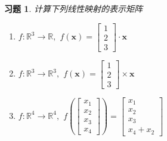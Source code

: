 \documentclass[UTF8]{ctexart}
\newcommand\bs[1]{\boldsymbol{ #1}}
\newtheorem{ex}[thm]{习题}
\begin{document}
\begin{ex}
计算下列线性映射的表示矩阵

\begin{enumerate}
\item $f : \mathbb{R}^3 \to \mathbb{R},$ $f (\bs x ) = \begin{bmatrix}
				1 \\ 2 \\ 3
			\end{bmatrix}\cdot \bs x$

\item $f : \mathbb{R}^3 \to \mathbb{R}^3,$ $f (\bs x ) = \begin{bmatrix}
				1 \\ 2 \\ 3
			\end{bmatrix}\times \bs x$

\item $ f : \mathbb{R}^4 \to \mathbb{R}^4, $ $f \left( \begin{bmatrix}
				x_1 \\ x_2 \\ x_3 \\ x_4
			\end{bmatrix} \right) = \begin{bmatrix}
				x_1 \\ x_2 \\ x_3 \\ x_4 + x_2
			\end{bmatrix}$

\end{enumerate}
\end{ex}
\end{document}
